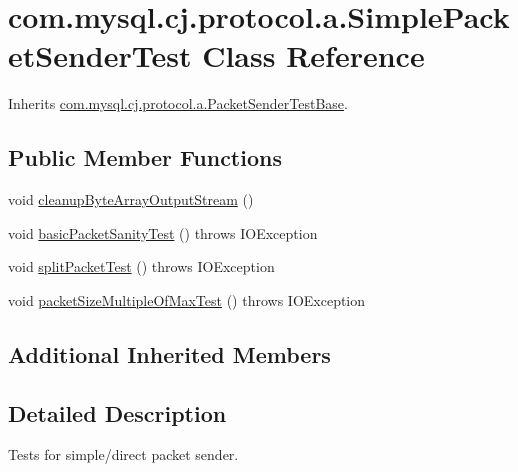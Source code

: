 \hypertarget{classcom_1_1mysql_1_1cj_1_1protocol_1_1a_1_1_simple_packet_sender_test}{}\section{com.\+mysql.\+cj.\+protocol.\+a.\+Simple\+Packet\+Sender\+Test Class Reference}
\label{classcom_1_1mysql_1_1cj_1_1protocol_1_1a_1_1_simple_packet_sender_test}


Inherits \mbox{\hyperlink{classcom_1_1mysql_1_1cj_1_1protocol_1_1a_1_1_packet_sender_test_base}{com.\+mysql.\+cj.\+protocol.\+a.\+Packet\+Sender\+Test\+Base}}.

\subsection*{Public Member Functions}
\begin{DoxyCompactItemize}
\item 
void \mbox{\hyperlink{classcom_1_1mysql_1_1cj_1_1protocol_1_1a_1_1_simple_packet_sender_test_a5c78726ca165427e15d365c78cfcb2ea}{cleanup\+Byte\+Array\+Output\+Stream}} ()
\item 
void \mbox{\hyperlink{classcom_1_1mysql_1_1cj_1_1protocol_1_1a_1_1_simple_packet_sender_test_a1e427d6e3fdd095ee9b5788a65a72bc2}{basic\+Packet\+Sanity\+Test}} ()  throws I\+O\+Exception 
\item 
void \mbox{\hyperlink{classcom_1_1mysql_1_1cj_1_1protocol_1_1a_1_1_simple_packet_sender_test_a2e967f47da2c1c278edc1d355c9d4a89}{split\+Packet\+Test}} ()  throws I\+O\+Exception 
\item 
void \mbox{\hyperlink{classcom_1_1mysql_1_1cj_1_1protocol_1_1a_1_1_simple_packet_sender_test_a5936ffe2c8c3738af9838f7fa5a05624}{packet\+Size\+Multiple\+Of\+Max\+Test}} ()  throws I\+O\+Exception 
\end{DoxyCompactItemize}
\subsection*{Additional Inherited Members}


\subsection{Detailed Description}
Tests for simple/direct packet sender. 

